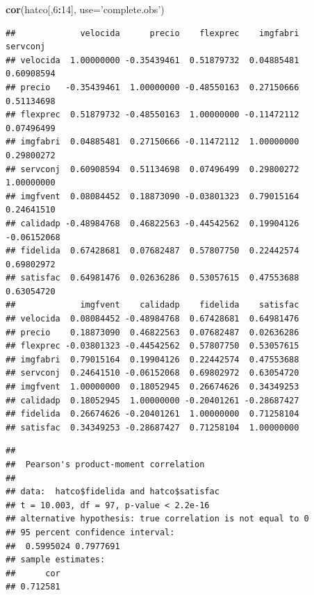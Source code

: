 \documentclass[]{book}
\newenvironment{Shaded}{\begin{snugshade}}{\end{snugshade}}
\newcommand{\DataTypeTok}[1]{\textcolor[rgb]{0.13,0.29,0.53}{#1}}
\newcommand{\DecValTok}[1]{\textcolor[rgb]{0.00,0.00,0.81}{#1}}
\newcommand{\KeywordTok}[1]{\textcolor[rgb]{0.13,0.29,0.53}{\textbf{#1}}}
\newcommand{\NormalTok}[1]{#1}
\newcommand{\OperatorTok}[1]{\textcolor[rgb]{0.81,0.36,0.00}{\textbf{#1}}}
\newcommand{\StringTok}[1]{\textcolor[rgb]{0.31,0.60,0.02}{#1}}
\begin{document}
\begin{Shaded}
\begin{Highlighting}[]
\KeywordTok{cor}\NormalTok{(hatco[,}\DecValTok{6}\OperatorTok{:}\DecValTok{14}\NormalTok{], }\DataTypeTok{use=}\StringTok{'complete.obs'}\NormalTok{)}
\end{Highlighting}
\end{Shaded}

\begin{verbatim}
##             velocida      precio    flexprec    imgfabri    servconj
## velocida  1.00000000 -0.35439461  0.51879732  0.04885481  0.60908594
## precio   -0.35439461  1.00000000 -0.48550163  0.27150666  0.51134698
## flexprec  0.51879732 -0.48550163  1.00000000 -0.11472112  0.07496499
## imgfabri  0.04885481  0.27150666 -0.11472112  1.00000000  0.29800272
## servconj  0.60908594  0.51134698  0.07496499  0.29800272  1.00000000
## imgfvent  0.08084452  0.18873090 -0.03801323  0.79015164  0.24641510
## calidadp -0.48984768  0.46822563 -0.44542562  0.19904126 -0.06152068
## fidelida  0.67428681  0.07682487  0.57807750  0.22442574  0.69802972
## satisfac  0.64981476  0.02636286  0.53057615  0.47553688  0.63054720
##             imgfvent    calidadp    fidelida    satisfac
## velocida  0.08084452 -0.48984768  0.67428681  0.64981476
## precio    0.18873090  0.46822563  0.07682487  0.02636286
## flexprec -0.03801323 -0.44542562  0.57807750  0.53057615
## imgfabri  0.79015164  0.19904126  0.22442574  0.47553688
## servconj  0.24641510 -0.06152068  0.69802972  0.63054720
## imgfvent  1.00000000  0.18052945  0.26674626  0.34349253
## calidadp  0.18052945  1.00000000 -0.20401261 -0.28687427
## fidelida  0.26674626 -0.20401261  1.00000000  0.71258104
## satisfac  0.34349253 -0.28687427  0.71258104  1.00000000
\end{verbatim}

\begin{Shaded}
\end{Shaded}

\begin{verbatim}
## 
##  Pearson's product-moment correlation
## 
## data:  hatco$fidelida and hatco$satisfac
## t = 10.003, df = 97, p-value < 2.2e-16
## alternative hypothesis: true correlation is not equal to 0
## 95 percent confidence interval:
##  0.5995024 0.7977691
## sample estimates:
##      cor 
## 0.712581
\end{verbatim}
\end{document}
